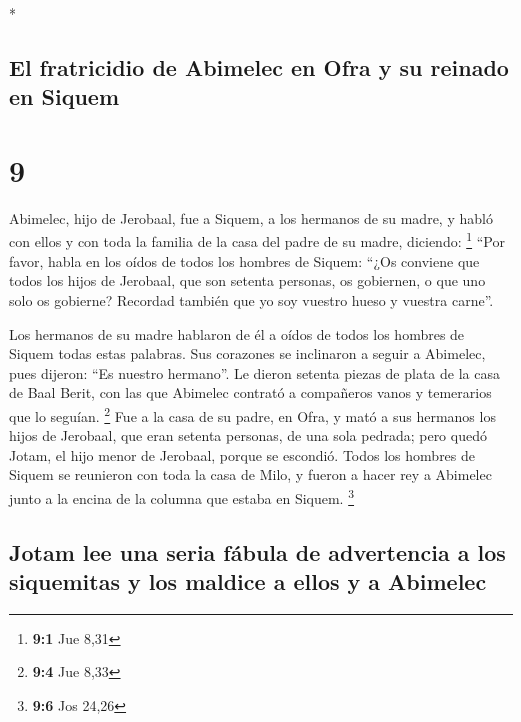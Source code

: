 \begin{paracol}{2}
\begin{otherlanguage}{english}
\end{otherlanguage}

\switchcolumn[0]*

\hypertarget{el-fratricidio-de-abimelec-en-ofra-y-su-reinado-en-siquem}{%
\subsection{El fratricidio de Abimelec en Ofra y su reinado en
Siquem}\label{el-fratricidio-de-abimelec-en-ofra-y-su-reinado-en-siquem}}

\hypertarget{section-16}{%
\section{9}\label{section-16}}

 Abimelec, hijo de Jerobaal, fue a Siquem, a los hermanos
de su madre, y habló con ellos y con toda la familia de la casa del
padre de su madre, diciendo: \footnote{\textbf{9:1} Jue 8,31}
 ``Por favor, habla en los oídos de todos los hombres de
Siquem: ``¿Os conviene que todos los hijos de Jerobaal, que son setenta
personas, os gobiernen, o que uno solo os gobierne? Recordad también que
yo soy vuestro hueso y vuestra carne''.

 Los hermanos de su madre hablaron de él a oídos de todos
los hombres de Siquem todas estas palabras. Sus corazones se inclinaron
a seguir a Abimelec, pues dijeron: ``Es nuestro hermano''.
 Le dieron setenta piezas de plata de la casa de Baal
Berit, con las que Abimelec contrató a compañeros vanos y temerarios que
lo seguían. \footnote{\textbf{9:4} Jue 8,33}  Fue a la
casa de su padre, en Ofra, y mató a sus hermanos los hijos de Jerobaal,
que eran setenta personas, de una sola pedrada; pero quedó Jotam, el
hijo menor de Jerobaal, porque se escondió.  Todos los
hombres de Siquem se reunieron con toda la casa de Milo, y fueron a
hacer rey a Abimelec junto a la encina de la columna que estaba en
Siquem. \footnote{\textbf{9:6} Jos 24,26}

\hypertarget{jotam-lee-una-seria-fuxe1bula-de-advertencia-a-los-siquemitas-y-los-maldice-a-ellos-y-a-abimelec}{%
\subsection{Jotam lee una seria fábula de advertencia a los siquemitas y
los maldice a ellos y a
Abimelec}\label{jotam-lee-una-seria-fuxe1bula-de-advertencia-a-los-siquemitas-y-los-maldice-a-ellos-y-a-abimelec}}


\end{paracol}
